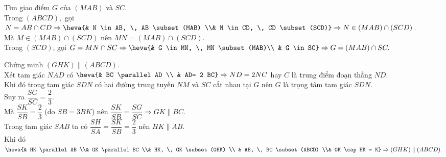 \begin{bt}
{\begin{listEX}
{\begin{tikzpicture}[line join=round,line cap=round,line width=.6pt,font=\footnotesize,scale=1]
\end{tikzpicture}}
\item Tìm giao điểm $G$ của $(MAB)$ và $SC$.\\
Trong $(ABCD),$ gọi $N= AB \cap CD \Rightarrow \heva{& N \in AB, \, AB \subset (MAB) \\& N \in CD, \, CD \subset (SCD)} \Rightarrow N \in (MAB) \cap (SCD)$.\\
Mà $M \in (MAB) \cap (SCD)$ nên $MN = (MAB) \cap (SCD)$.\\
Trong $(SCD)$, gọi $G= MN \cap SC \Rightarrow \heva{& G \in MN, \, MN \subset (MAB)\\ & G \in SC} \Rightarrow G= (MAB) \cap SC.$
\item Chứng minh $(GHK) \parallel (ABCD)$.\\
Xét tam giác $NAD$ có $\heva{& BC \parallel AD \\ & AD= 2 BC} \Rightarrow ND=2 NC$ hay $C$ là trung điểm đoạn thẳng $ND$.\\
Khi đó trong tam giác $SDN$ có hai đường trung tuyến $NM$ và $SC$ cắt nhau tại $G$ nên $G$ là trọng tâm tam giác $SDN$.\\
Suy ra $\dfrac{SG}{SC}=\dfrac{2}{3}$.\\
Mà $\dfrac{SK}{SB}=\dfrac{2}{3}$ (do $SB= 3 BK$) nên $\dfrac{SK}{SB}=\dfrac{SG}{SC} \Rightarrow GK \parallel BC$.\\
Trong tam giác $SAB$ ta có $\dfrac{SH}{SA}=\dfrac{SK}{SB}=\dfrac{2}{3}$ nên $HK \parallel AB$.\\
Khi đó $\heva{& HK \parallel AB  \\& GK \parallel BC \\& HK, \, GK \subset (GHK) \\ & AB, \, BC \subset (ABCD) \\& GK \cap HK = K} \Rightarrow (GHK) \parallel (ABCD).$
\end{listEX}}
\end{bt}

